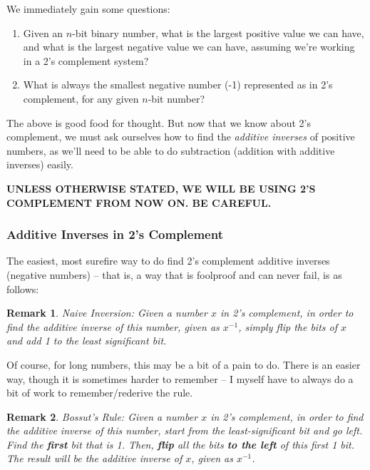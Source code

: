\documentclass[12pt]{article}
\newtheorem*{remark}
{Remark}
\begin{document}
    We immediately gain some questions:

    \begin{enumerate}
        \item Given an $n$-bit binary number, what is the largest positive value we can have,
        and what is the largest negative value we can have, assuming we're working in a 2's complement
        system?
        \item What is always the smallest negative number (-1) represented
        as in 2's complement, for any given $n$-bit number?
    \end{enumerate}

    The above is good food for thought. But now that
    we know about 2's complement, we must ask ourselves how to find the \textit{additive inverses}
    of positive numbers, as we'll need to be able to do subtraction (addition with additive inverses)
    easily.

    \textbf{UNLESS OTHERWISE STATED, WE WILL BE USING 2'S COMPLEMENT FROM NOW ON. BE CAREFUL.}

    \subsubsection{Additive Inverses in 2's Complement}

    The easiest, most surefire way to do find
    2's complement additive inverses (negative numbers) -- that is, a way that is foolproof and can never fail,
    is as follows:

    \begin{remark}
        Naive Inversion: Given a number $x$ in 2's complement, in order to find the additive inverse
        of this number, given as $x^{-1}$, simply flip the bits of $x$ and add 1 to the least significant bit.
    \end{remark}


    Of course, for long numbers, this may be a bit of a pain to do. There is an easier way, though it is sometimes
    harder to remember -- I myself have to always do a bit of work to remember/rederive the rule.

    \begin{remark}
        Bossut's Rule: Given a number $x$ in 2's complement, in order to find the additive inverse of this number,
        start from the least-significant bit and go left. Find the \textbf{first} bit that is 1. Then, \textbf{flip}
        all the bits \textbf{to the left} of this first 1 bit. The result will be the additive inverse of $x$, given
        as $x^{-1}$.        
    \end{remark}
\end{document}
